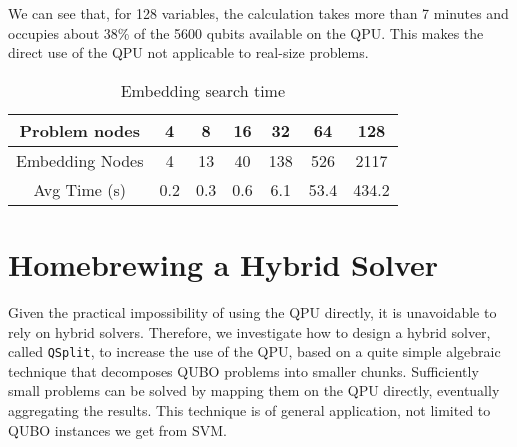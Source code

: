 \documentclass{ceurart}
\begin{document}
We can see that, for 128 variables, the calculation takes more than 7 minutes and occupies about 38\% of the 5600 qubits available on the QPU. This makes the direct use of the QPU not applicable to real-size problems.

\begin{table}
    \caption{Embedding search time}
    \label{tab:embedding}
    \begin{tabular}{ccccccc}
        \toprule
        Problem nodes & 4 & 8 & 16 & 32 & 64 & 128 \\  
        \midrule
        Embedding Nodes & 4 & 13 & 40 & 138 & 526 & 2117 \\
        Avg Time (s) & 0.2 & 0.3 & 0.6 & 6.1 & 53.4 & 434.2 \\
        \bottomrule
    \end{tabular}
\end{table}

\section{Homebrewing a Hybrid Solver}

Given the practical impossibility of using the QPU directly, it is unavoidable to rely on hybrid solvers. Therefore, we investigate how to design a hybrid solver, called \verb|QSplit|, to increase the use of the QPU, based on a quite simple algebraic technique that decomposes QUBO problems into smaller chunks. Sufficiently small problems can be solved by mapping them on the QPU directly, eventually aggregating the results. This technique is of general application, not limited to QUBO instances we get from SVM.
\end{document}

